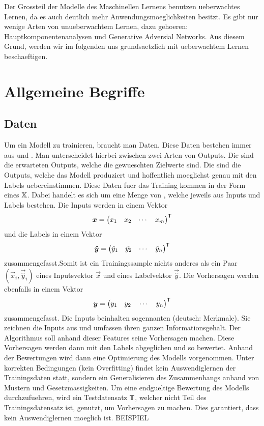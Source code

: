 Der Grossteil der Modelle des Maschinellen Lernens benutzen ueberwachtes
Lernen, da es auch deutlich mehr Anwendungsmoeglichkeiten besitzt. Es gibt nur wenige Arten von
unueberwachtem Lernen, dazu gehoeren: Hauptkomponentenanalysen und Generative
Adversial Networks. Aus diesem Grund, werden wir im folgenden uns grundsaetzlich
mit ueberwachtem Lernen beschaeftigen.
\para{}
\cite{wiki:supervised_learning}
\cite{wiki:unsupervised_learning}

\section{Allgemeine Begriffe}

\subsection{Daten}

Um ein Modell zu trainieren, braucht man Daten. Diese Daten bestehen immer aus
 und . Man unterscheidet hierbei zwischen zwei Arten
von Outputs. Die  sind die erwarteten Outputs, welche die
gewueschten Zielwerte sind. Die  sind die Outputs, welche
das Modell produziert und hoffentlich moeglichst genau mit den Labels
uebereinstimmen.
\para{}
Diese Daten fuer das Training kommen in der Form eines  $\mathbb{X}$.
Dabei handelt es sich um eine Menge von ,
welche jeweils aus Inputs und Labels bestehen.
Die Inputs werden in einem Vektor
\[ \bm{x} = \begin{pmatrix} x_1 & x_2 & \cdots & x_m \end{pmatrix}^{\mathsf{T}} \]
und die Labels in einem Vektor
\[ \bm{\hat{y}} = \begin{pmatrix} \hat{y}_1 & \hat{y_2} & \cdots & \hat{y}_n \end{pmatrix}^{\mathsf{T}} \]
zusammengefasst.Somit ist ein Trainingssample nichts anderes als ein Paar
$(\vec{x}_i,\vec{\hat{y}}_i)$ eines Inputsvektor $\vec{x}$ und eines Labelvektor
$\vec{\hat{y}}$.
Die Vorhersagen werden ebenfalls in einem Vektor
\[\bm{y} = \begin{pmatrix} y_1 \quad y_2 \quad \cdots \quad y_n \end{pmatrix}^{\mathsf{T}} \]
zusammengefasst.
\para{}
Die Inputs beinhalten sogennanten  (deutsch: Merkmale). Sie
zeichnen die Inputs aus und umfassen ihren ganzen Informationsgehalt.
Der Algorithmus soll
anhand dieser Features seine Vorhersagen machen.
Diese Vorhersagen werden dann mit den Labels abgeglichen und so bewertet.
Anhand der Bewertungen wird dann eine Optimierung des Modells vorgenommen.
Unter korrekten Bedingungen (kein Overfitting) findet kein Auswendiglernen der Trainingsdaten statt,
sondern ein Generalisieren des Zusammenhangs anhand von Mustern und Gesetzmassigkeiten.
\para{}
Um eine endgueltige Bewertung des Modells durchzufuehren, wird ein Testdatensatz
$\mathbb{T}$, welcher nicht Teil des Trainingsdatensatz ist, genutzt, um Vorhersagen zu machen.
Dies garantiert, dass kein Auswendiglernen moeglich ist.
\para{}
BEISPIEL


